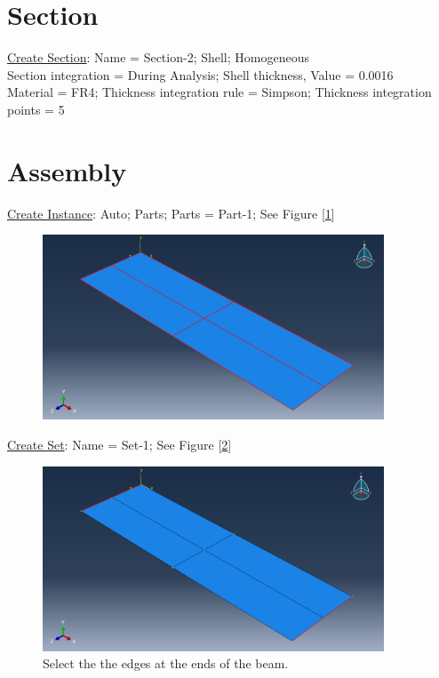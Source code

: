 \documentclass{article}
\begin{document}
	\section{Section}
	\underline{Create Section}: Name = Section-2; Shell; Homogeneous\\
	Section integration = During Analysis; Shell thickness, Value = 0.0016\\
	Material = FR4; Thickness integration rule = Simpson; Thickness integration points = 5
	
	\section{Assembly}
	\underline{Create Instance}: Auto; Parts; Parts = Part-1; See Figure [\ref{fig:instance}]
	\begin{figure}[H]
		\centering
		\includegraphics[width=4in]{Figures/instance.png}
		\caption{}
		\label{fig:instance}
	\end{figure}
	
	\underline{Create Set}: Name = Set-1; See Figure [\ref{fig:instance_set1}]
	\begin{figure}[H]
		\centering
		\includegraphics[width=4in]{Figures/instance_set1.png}
		\caption{Select the the edges at the ends of the beam.}
		\label{fig:instance_set1}
	\end{figure}
	
\end{document}
